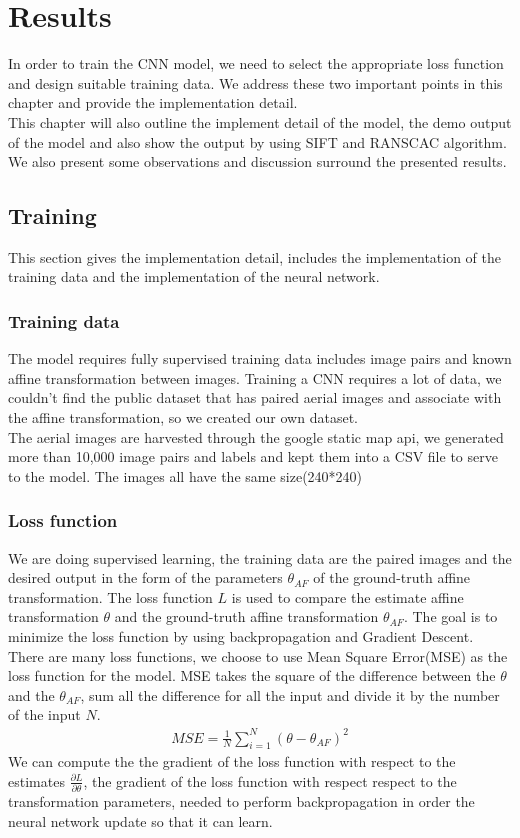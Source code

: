 \chapter{Results}
In order to train the CNN model, we need to select the appropriate loss function and design suitable training data. We address these two important points in this chapter and provide the implementation detail.\\
  This chapter will also outline the implement detail of the model, the demo output of the model and also show the output by using SIFT\citep{lowe2004distinctive} and RANSCAC\citep{fischler1981random} algorithm. We also present some observations and discussion surround the presented results. \\
  


\section{Training}
This section gives the implementation detail, includes the implementation of the training data and the implementation of the neural network. 

\subsection{Training data}
The model requires fully supervised training data includes image pairs and known affine transformation between images. Training a CNN requires a lot of data, we couldn't find the public dataset that has paired aerial images and associate with the affine transformation, so we created our own dataset.\\
  The aerial images are harvested through the google static map api, we generated more than 10,000 image pairs and labels and kept them into a CSV file to serve to the model. The images all have the same size(240*240)
\subsection{Loss function}
  We are doing supervised learning, the training data are the paired images and the desired output in the form of the parameters $\theta_{AF}$ of the ground-truth affine transformation. The loss function $L$ is used to compare the estimate affine transformation $\theta$ and the ground-truth affine transformation $\theta_{AF}$. The goal is to minimize the loss function by using backpropagation and Gradient Descent.\\
  There are many loss functions, we choose to use Mean Square Error(MSE) as the loss function for the model. MSE takes the square of the difference between the $\theta$ and the $\theta_{AF}$, sum all the difference for all the input and divide it by the number of the input $N$.
\begin{align*}
MSE = \frac{1}{N}\sum_{i=1}^{N}{(\theta - \theta_{AF})}^2
\end{align*}
  We can compute the the gradient of the loss function with respect to the estimates 
  $\frac{\partial L}{\partial \theta}$, the gradient of the loss function with respect respect to the transformation parameters, needed to perform backpropagation in order the neural network update so that it can learn. 

